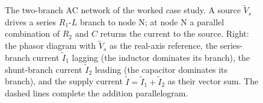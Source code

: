 \begin{figure}[htbp]
\caption[A two-branch AC network and its phasor diagram]{The two-branch
AC network of the worked case study. A source $\tilde V_s$ drives a
series $R_1$-$L$ branch to node $\mathrm{N}$; at node $\mathrm{N}$ a
parallel combination of $R_2$ and $C$ returns the current to the source.
Right: the phasor diagram with $\tilde V_s$ as the real-axis reference,
the series-branch current $\tilde I_1$ lagging (the inductor dominates
its branch), the shunt-branch current $\tilde I_2$ leading (the capacitor
dominates its branch), and the supply current $\tilde I = \tilde I_1 +
\tilde I_2$ as their vector sum. The dashed lines complete the
addition parallelogram.}
\label{fig:vol02:ch03:ac-network}
\end{figure}
